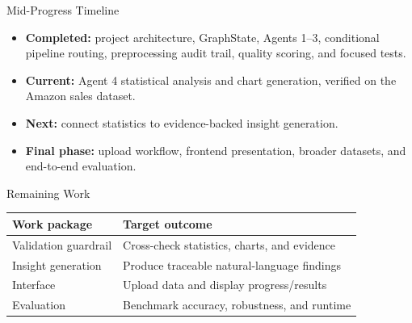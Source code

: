
\begin{frame}{Mid-Progress Timeline}
    \begin{itemize}
        \item \textbf{Completed:} project architecture, GraphState, Agents 1--3, conditional pipeline routing, preprocessing audit trail, quality scoring, and focused tests.
        \item \textbf{Current:} Agent 4 statistical analysis and chart generation, verified on the Amazon sales dataset.
        \item \textbf{Next:} connect statistics to evidence-backed insight generation.
        \item \textbf{Final phase:} upload workflow, frontend presentation, broader datasets, and end-to-end evaluation.
    \end{itemize}
\end{frame}

\begin{frame}{Remaining Work}
    \begin{center}
        \begin{tabular}{p{} p{}}
            \textbf{Work package} & \textbf{Target outcome} \\
            \hline
            Validation guardrail & Cross-check statistics, charts, and evidence \\
            Insight generation & Produce traceable natural-language findings \\
            Interface & Upload data and display progress/results \\
            Evaluation & Benchmark accuracy, robustness, and runtime
        \end{tabular}
    \end{center}
\end{frame}
